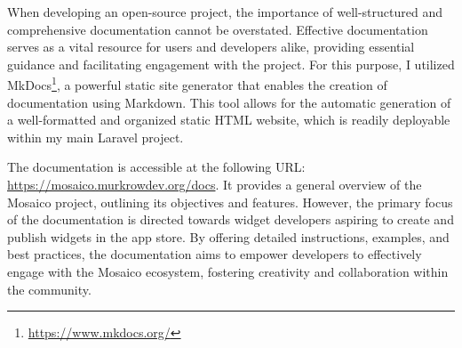 When developing an open-source project, the importance of well-structured and comprehensive documentation cannot be overstated. Effective documentation serves as a vital resource for users and developers alike, providing essential guidance and facilitating engagement with the project. For this purpose, I utilized MkDocs\footnote{\url{https://www.mkdocs.org/}}, a powerful static site generator that enables the creation of documentation using Markdown. This tool allows for the automatic generation of a well-formatted and organized static HTML website, which is readily deployable within my main Laravel project.

The documentation is accessible at the following URL: \url{https://mosaico.murkrowdev.org/docs}. It provides a general overview of the Mosaico project, outlining its objectives and features. However, the primary focus of the documentation is directed towards widget developers aspiring to create and publish widgets in the app store. By offering detailed instructions, examples, and best practices, the documentation aims to empower developers to effectively engage with the Mosaico ecosystem, fostering creativity and collaboration within the community.